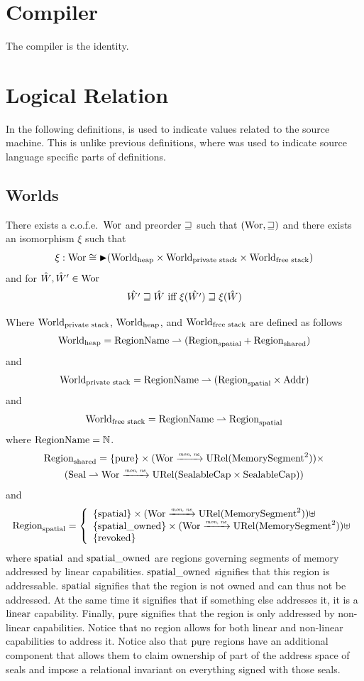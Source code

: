 \documentclass[a4paper]{article}
\begin{document}
\section{Compiler}
\label{sec:compiler}

The compiler is the identity.

\section{Logical Relation}
In the following definitions,  is used to indicate values related to the source machine. This is unlike previous definitions, where  was used to indicate source language specific parts of definitions.
\subsection{Worlds}
\label{subsec:worlds}
\begin{theorem}
  \label{thm:recursive-domain-eq}
  There exists a c.o.f.e.\ $\mathrm{Wor}$ and preorder $\sqsupseteq$ such that $(\mathrm{Wor},\sqsupseteq)$ and there exists an isomorphism $\xi$ such that
  \[
    \xi : \mathrm{Wor} \cong \mathop{\blacktriangleright} (\mathrm{World}_\mathrm{heap} \times \mathrm{World}_\text{private stack} \times \mathrm{World}_\text{free stack})
  \]
  and for $\hat{W},\hat{W}' \in \mathrm{Wor}$
  \[
    \hat{W'} \sqsupseteq \hat{W}\text{ iff }\xi(\hat{W'}) \sqsupseteq \xi(\hat{W})
  \]
\end{theorem}

Where $\mathrm{World}_\text{private stack}$, $\mathrm{World}_\mathrm{heap}$, and $\mathrm{World}_\text{free stack}$ are defined as follows
\[
  \mathrm{World}_\mathrm{heap} = \mathrm{RegionName} \rightharpoonup (\mathrm{Region}_\mathrm{spatial} + \mathrm{Region}_\mathrm{shared})
\]
and
\[
  \mathrm{World}_\text{private stack} = \mathrm{RegionName} \rightharpoonup (\mathrm{Region}_\mathrm{spatial} \times \mathrm{Addr})
\]
and
\[
  \mathrm{World}_\text{free stack} = \mathrm{RegionName} \rightharpoonup \mathrm{Region}_\mathrm{spatial}
\]
where $\mathrm{RegionName} = \mathbb{N}$.
\begin{multline*}
  \mathrm{Region}_\mathrm{shared} = 
  \{\mathrm{pure} \} \times (\mathrm{Wor} \xrightarrow{\textit{\tiny{mon, ne}}} \mathrm{URel}(\mathrm{MemorySegment}^2)) \times \\
  (\mathrm{Seal} \rightharpoonup \mathrm{Wor} \xrightarrow{\textit{\tiny{mon, ne}}} \mathrm{URel}(\mathrm{SealableCap} \times \mathrm{SealableCap}))
\end{multline*}
and
\[
  \mathrm{Region}_\mathrm{spatial} = \left\{
  \begin{array}{l}
    \{\mathrm{spatial} \} \times (\mathrm{Wor} \xrightarrow{\textit{\tiny{mon, ne}}} \mathrm{URel}(\mathrm{MemorySegment}^2)) \uplus \\
    \{\mathrm{spatial\_owned} \} \times (\mathrm{Wor} \xrightarrow{\textit{\tiny{mon, ne}}} \mathrm{URel}(\mathrm{MemorySegment}^2))\uplus \\ 
    \{\mathrm{revoked}\}
  \end{array} \right.
\]
where $\mathrm{spatial}$ and $\mathrm{spatial\_owned}$ are regions governing segments of memory addressed by linear capabilities.
$\mathrm{spatial\_owned}$ signifies that this region is addressable.
$\mathrm{spatial}$ signifies that the region is not owned and can thus not be addressed.
At the same time it signifies that if something else addresses it, it is a $\mathrm{linear}$ capability.
Finally, $\mathrm{pure}$ signifies that the region is only addressed by non-linear capabilities.
Notice that no region allows for both linear and non-linear capabilities to address it.
Notice also that $\mathrm{pure}$ regions have an additional component that allows them to claim ownership of part of the address space of seals and impose a relational invariant on everything signed with those seals.
\end{document}

